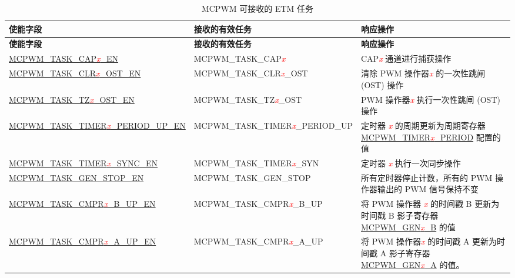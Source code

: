 \begin{longtable}{ | l | l | p{4.2cm} |}
    \caption{MCPWM 可接收的 ETM 任务}
    \label{tab:mcpwm-etm-task}
    \\\hline
    \rowcolor{lightgray}
   \textbf{使能字段} & \textbf{接收的有效任务} & \textbf{响应操作} \\\hline
    \endfirsthead
    \hline
    \rowcolor{lightgray}   
    \textbf{使能字段} & \textbf{接收的有效任务} & \textbf{响应操作}  \\\hline
    \endhead
    \hline
    \endfoot
    
    \hyperref[fielddesc:MCPWMTASKCAP0EN]{MCPWM\_TASK\_CAP\textcolor{red}{\it{x}}\_EN}
    &  MCPWM\_TASK\_CAP\textcolor{red}{\it{x}}
    &  CAP\textcolor{red}{\it{x}} 通道进行捕获操作 \\\hline
    \hyperref[fielddesc:MCPWMTASKCLR0OSTEN]{MCPWM\_TASK\_CLR\textcolor{red}{\it{x}}\_OST\_EN}
    &  MCPWM\_TASK\_CLR\textcolor{red}{\it{x}}\_OST
    &  清除 PWM 操作器\textcolor{red}{\it{x}} 的一次性跳闸 (OST) 操作 \\\hline
    \hyperref[fielddesc:MCPWMTASKTZ0OSTEN]{MCPWM\_TASK\_TZ\textcolor{red}{\it{x}}\_OST\_EN}
    &  MCPWM\_TASK\_TZ\textcolor{red}{\it{x}}\_OST
    &  PWM 操作器\textcolor{red}{\it{x}} 执行一次性跳闸 (OST) 操作 \\\hline
    \hyperref[fielddesc:MCPWMTASKTIMER0PERIODUPEN]{MCPWM\_TASK\_TIMER\textcolor{red}{\it{x}}\_PERIOD\_UP\_EN}
    &  MCPWM\_TASK\_TIMER\textcolor{red}{\it{x}}\_PERIOD\_UP
    &  定时器 \textcolor{red}{\it{x}} 的周期更新为周期寄存器 \hyperref[fielddesc:MCPWMTIMER0PERIOD]{MCPWM\_TIMER\textcolor{red}{\it{x}}\_PERIOD} 配置的值 \\\hline
    \hyperref[fielddesc:MCPWMTASKTIMER0SYNCEN]{MCPWM\_TASK\_TIMER\textcolor{red}{\it{x}}\_SYNC\_EN}
    &  MCPWM\_TASK\_TIMER\textcolor{red}{\it{x}}\_SYN
    &  定时器 \textcolor{red}{\it{x}} 执行一次同步操作 \\\hline
    \hyperref[fielddesc:MCPWMTASKGENSTOPEN]{MCPWM\_TASK\_GEN\_STOP\_EN}
    &  MCPWM\_TASK\_GEN\_STOP
    &  所有定时器停止计数，所有的 PWM 操作器输出的 PWM 信号保持不变 \\\hline
    \hyperref[fielddesc:MCPWMTASKCMPR0BUPEN]{MCPWM\_TASK\_CMPR\textcolor{red}{\it{x}}\_B\_UP\_EN}
    &  MCPWM\_TASK\_CMPR\textcolor{red}{\it{x}}\_B\_UP
    &  将 PWM 操作器 \textcolor{red}{\it{x}} 的时间戳 B 更新为时间戳 B 影子寄存器 \hyperref[fielddesc:MCPWMGEN0B]{MCPWM\_GEN\textcolor{red}{\it{x}}\_B} 的值 \\\hline
    \hyperref[fielddesc:MCPWMTASKCMPR0AUPEN]{MCPWM\_TASK\_CMPR\textcolor{red}{\it{x}}\_A\_UP\_EN}
    &  MCPWM\_TASK\_CMPR\textcolor{red}{\it{x}}\_A\_UP
    &  将 PWM 操作器\textcolor{red}{\it{x}} 的时间戳 A 更新为时间戳 A 影子寄存器 \hyperref[fielddesc:MCPWMGEN0A]{MCPWM\_GEN\textcolor{red}{\it{x}}\_A} 的值。 \\\hline
\end{longtable}
